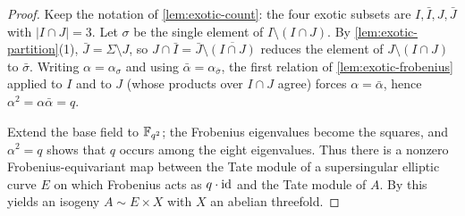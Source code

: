 \begin{proof}
  Keep the notation of \cref{lem:exotic-count}: the four exotic subsets are
  \(I, \bar I, J, \bar J\) with \(|I \cap J| = 3\). Let \(\sigma\) be the single
  element of \(I \setminus (I \cap J)\). By \cref{lem:exotic-partition}(1),
  \(\bar J = \Sigma \setminus J\), so \(J \cap \bar I = \bar J \setminus
  \overline{(I \cap J)}\) reduces the element of \(J \setminus (I \cap J)\) to
  \(\bar\sigma\). Writing \(\alpha = \alpha_\sigma\) and using
  \(\bar\alpha = \alpha_{\bar\sigma}\), the first relation of
  \cref{lem:exotic-frobenius} applied to \(I\) and to \(J\) (whose products over
  \(I \cap J\) agree) forces \(\alpha = \bar\alpha\), hence
  \(\alpha^2 = \alpha \bar\alpha = q\).

  Extend the base field to \(\mathbb{F}_{q^2}\); the Frobenius eigenvalues become the
  squares, and \(\alpha^2 = q\) shows that \(q\) occurs among the eight
  eigenvalues. Thus there is a nonzero Frobenius-equivariant map between the
  Tate module of a supersingular elliptic curve \(E\) on which Frobenius acts as
  \(q \cdot \mathrm{id}\) and the Tate module of \(A\). By \cite[Theorem 4]{Tate} this
  yields an isogeny \(A \sim E \times X\) with \(X\) an abelian threefold.
\end{proof}

